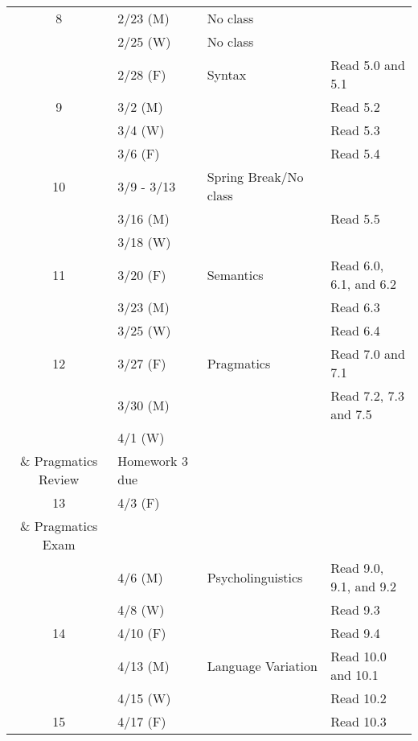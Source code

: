\documentclass{article}
\makeatletter
\newcommand{\cellbreak}[2]{
    \begin{tabular}[t]{@{}l@{}}
      #1\\
      #2
    \end{tabular}}
\makeatother
\begin{document}
\begin{longtable}{c l l l}
      8     & 2/23 (M)    & No class                        & \\
            & 2/25 (W)    & No class                        & \\
            & 2/28 (F)    & Syntax                          & Read 5.0 and 5.1\\
      9     & 3/2 (M)     &                                 & Read 5.2\\
            & 3/4 (W)     &                                 & Read 5.3\\
            & 3/6 (F)     &                                 & Read 5.4\\
      10    & 3/9 - 3/13  & Spring Break/No class           & \\
            & 3/16 (M)    &                                 & Read 5.5\\
            & 3/18 (W)    &                                 & \\
      11    & 3/20 (F)    & Semantics                       & Read 6.0, 6.1, and 6.2\\
            & 3/23 (M)    &                                 & Read 6.3\\
            & 3/25 (W)    &                                 & Read 6.4\\
      12    & 3/27 (F)    & Pragmatics                      & Read 7.0 and 7.1\\
            & 3/30 (M)    &                                 & Read 7.2, 7.3 and 7.5\\
            & 4/1 (W)     & \cellbreak{Syntax, Semantics}
                                      {\& Pragmatics Review}& Homework 3 due\\
      13    & 4/3 (F)     & \cellbreak{Syntax, Semantics}
                                      {\& Pragmatics Exam}  & \\
            & 4/6 (M)     & Psycholinguistics               & Read 9.0, 9.1, and 9.2\\
            & 4/8 (W)     &                                 & Read 9.3\\
      14    & 4/10 (F)    &                                 & Read 9.4\\
            & 4/13 (M)    & Language Variation              & Read 10.0 and 10.1\\
            & 4/15 (W)    &                                 & Read 10.2\\
      15    & 4/17 (F)    &                                 & Read 10.3\\

\end{longtable}
\end{document}
